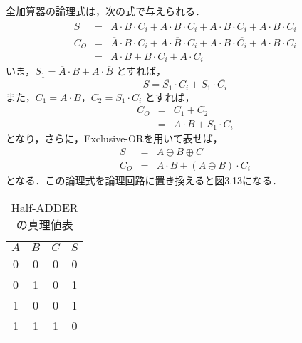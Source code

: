 全加算器の論理式は，次の式で与えられる．
\begin{eqnarray}
    S &=& \overline{A} \cdot \overline{B} \cdot C_i + \overline{A} \cdot B \cdot \overline{C_i} + A \cdot \overline{B} \cdot \overline{C_i} + A \cdot B \cdot C_i \label{eq11} \\
    C_O &=& \overline{A} \cdot B \cdot C_i + A \cdot \overline{B} \cdot C_i + A \cdot B \cdot \overline{C_i} + A \cdot B \cdot C_i \nonumber \\
    &=& A \cdot B + B \cdot C_i + A \cdot C_i \label{eq12}
\end{eqnarray}
いま，$S_1 = \overline{A} \cdot B + A \cdot \overline{B}$ とすれば，
\begin{equation}
    S = \overline{S_1} \cdot C_i + S_1 \cdot \overline{C_i} \label{eq13}
\end{equation}
また，$C_1 = A \cdot B$，$C_2 = S_1 \cdot C_i$ とすれば，
\begin{eqnarray}
    C_O &=& C_1 + C_2 \nonumber \\
    &=& A \cdot B + S_1 \cdot C_i \label{eq14}
\end{eqnarray}
となり，さらに，Exclusive-ORを用いて表せば，
\begin{eqnarray}
    S &=& A \oplus B \oplus C \label{eq15} \\
    C_O &=& A \cdot B + (A \oplus B) \cdot C_i \label{eq16}
\end{eqnarray}
となる．この論理式を論理回路に置き換えると図3.13になる．

\begin{table}[!h]
    \caption{Half-ADDERの真理値表}
    \label{tbl9}
    \begin{center}
        \begin{tabular}{|c|c||c|c|}
            \hline
            $A$ & $B$ & $C$ & $S$ \\
            \hhline{|=|=#=|=|}
            0   & 0   & 0   & 0   \\
            \hline
            0   & 1   & 0   & 1   \\
            \hline
            1   & 0   & 0   & 1   \\
            \hline
            1   & 1   & 1   & 0   \\
            \hline
        \end{tabular}
    \end{center}
\end{table}

